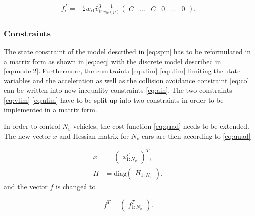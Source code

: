 \documentclass[letterpaper,10pt,conference]{ieeeconf}
\newcommand{\red}[1]{\textcolor{red}{#1}}  %
\begin{document}
\begin{align}
f_i^T =-2w_{i1}\bar{v}_{ir}^3\frac{1}{v_{ir}(p)} \begin{pmatrix} C & \hdots & C & 0 &\hdots & 0 \end{pmatrix}.
\end{align}

\subsubsection{Constraints}
The state constraint of the model described in \eqref{eq:spm} has to be reformulated in a matrix form as shown in \eqref{eq:aeq} with the discrete model described in \eqref{eq:model2}. Furthermore, the constraints \eqref{eq:vlim}-\eqref{eq:ulim} limiting the state variables and the acceleration as well as the collision avoidance constraint \eqref{eq:col} can be written into new inequality constraints \eqref{eq:ain}. The two constraints \eqref{eq:vlim}-\eqref{eq:ulim} have to be split up into two constraints in order to be implemented in a matrix form.

In order to control $N_v$ vehicles, the cost function \eqref{eq:quad} needs to be extended. The new vector $x$ and Hessian matrix for $N_v$ cars are then according to \eqref{eq:quad}

\begin{align}
x &=\begin{pmatrix}
x_{1:N_v}^T
\end{pmatrix}^T,\label{xvec}\\
H &= \text{diag}\begin{pmatrix}H_{1:N_v}\end{pmatrix},
\end{align}
and the vector $f$ is changed to

\begin{equation}
f^T =
\begin{pmatrix}
f^T_{1:N_v}
\end{pmatrix}.
\end{equation}
\end{document}

